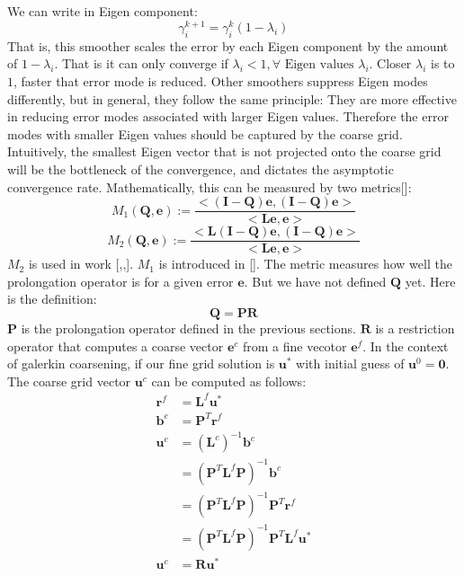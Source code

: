  We can write in Eigen component:
  \begin{equation}
  \gamma^{k+1}_i = \gamma^k_i(1-\lambda_i)
  \end{equation}
  That is, this smoother scales the error by each Eigen component by the amount of $1-\lambda_i$. That is it can only converge if $\lambda_i < 1, \forall \text{ Eigen values } \lambda_i$. Closer $\lambda_i$ is to $1$, faster that error mode is reduced. Other smoothers suppress Eigen modes differently, but in general, they follow the same principle: They are more effective in reducing error modes associated with larger Eigen values. Therefore the error modes with smaller Eigen values should be captured by the coarse grid. Intuitively, the smallest Eigen vector that is not projected onto the coarse grid will be the bottleneck of the convergence, and dictates the asymptotic convergence rate. Mathematically, this can be measured by two metrics[\cite{brezina2001algebraic}]: 
\begin{equation}
\label{equ:M1}
M_1(\mathbf{Q},\mathbf{e}) := \frac{<(\mathbf{I}-\mathbf{Q})\mathbf{e}, (\mathbf{I}-\mathbf{Q})\mathbf{e}>}{<\mathbf{L}\mathbf{e},\mathbf{e}>}
\end{equation}
\begin{equation}
\label{equ:M2}
M_2(\mathbf{Q},\mathbf{e}) := \frac{<\mathbf{L}(\mathbf{I}-\mathbf{Q})\mathbf{e}, (\mathbf{I}-\mathbf{Q})\mathbf{e}>}{<\mathbf{L}\mathbf{e},\mathbf{e}>}
\end{equation}
$M_2$ is used in work [\cite{mccormick1984multigrid},\cite{mccormick1982multigrid},\cite{mccormick1985multigrid}]. $M_1$ is introduced in [\cite{brandt1986algebraic}]. The metric measures how well the prolongation operator is for a given error $\mathbf{e}$. But we have not defined $\mathbf{Q}$ yet. Here is the definition: 
\begin{equation}
\mathbf{Q} = \mathbf{P}\mathbf{R}
\end{equation}
$\mathbf{P}$ is the prolongation operator defined in the previous sections. $\mathbf{R}$ is a restriction operator that computes a coarse vector $\mathbf{e}^c$ from a fine vecotor $\mathbf{e}^f$. In the context of galerkin coarsening, if our fine grid solution is $\mathbf{u}^*$ with initial guess of $\mathbf{u}^0 = \mathbf{0}$. The coarse grid vector $\mathbf{u}^c$ can be computed as follows:
\begin{align*}
\mathbf{r}^f &= \mathbf{L}^f\mathbf{u}^* \\
\mathbf{b}^c &= \mathbf{P}^T\mathbf{r}^f \\
\mathbf{u}^c &= (\mathbf{L}^c)^{-1}\mathbf{b}^c \\
&=  (\mathbf{P}^T\mathbf{L}^f\mathbf{P})^{-1}\mathbf{b}^c \\
&=  (\mathbf{P}^T\mathbf{L}^f\mathbf{P})^{-1}\mathbf{P}^T\mathbf{r}^f \\
&= (\mathbf{P}^T\mathbf{L}^f\mathbf{P})^{-1}\mathbf{P}^T\mathbf{L}^f\mathbf{u}^* \\
\mathbf{u}^c &= \mathbf{R} \mathbf{u}^*
\end{align*}
